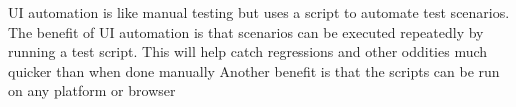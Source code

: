 UI automation 
    is like manual testing but uses a script to automate test scenarios. 
    The benefit of UI automation is that scenarios can be executed repeatedly by running a test script.
    This will help catch regressions and other oddities much quicker than when done manually
    Another benefit is that the scripts can be run on any platform or browser